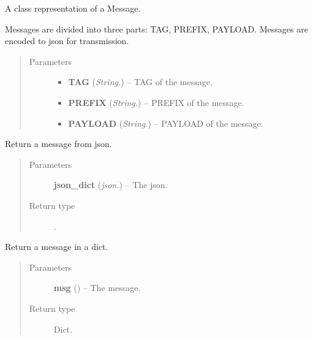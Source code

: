 \documentclass[letterpaper,10pt,english]{sphinxmanual}
\begin{document}
\begin{fulllineitems}
\label{api:swnp.Message}
A class representation of a Message.

Messages are divided into three parts: TAG, PREFIX, PAYLOAD.
Messages are encoded to json for transmission.
\begin{quote}\begin{description}
\item[{Parameters}] \leavevmode\begin{itemize}
\item {} 
\textbf{TAG} (\emph{String.}) -- TAG of the message.

\item {} 
\textbf{PREFIX} (\emph{String.}) -- PREFIX of the message.

\item {} 
\textbf{PAYLOAD} (\emph{String.}) -- PAYLOAD of the message.

\end{itemize}

\end{description}\end{quote}

\begin{fulllineitems}
\label{api:swnp.Message.from_json}
Return a message from json.
\begin{quote}\begin{description}
\item[{Parameters}] \leavevmode
\textbf{json\_dict} (\emph{json.}) -- The json.

\item[{Return type}] \leavevmode
{\hyperref[api:swnp.Message]{}}.

\end{description}\end{quote}

\end{fulllineitems}


\begin{fulllineitems}
\label{api:swnp.Message.to_dict}
Return a message in a dict.
\begin{quote}\begin{description}
\item[{Parameters}] \leavevmode
\textbf{msg} ({\hyperref[api:swnp.Message]{}}) -- The message.

\item[{Return type}] \leavevmode
Dict.

\end{description}\end{quote}

\end{fulllineitems}


\end{fulllineitems}
\end{document}
